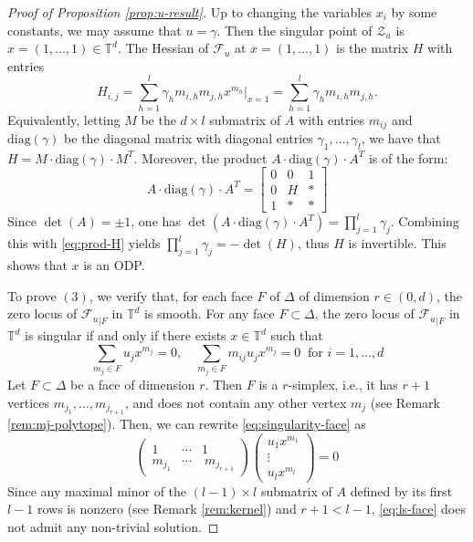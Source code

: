 \documentclass[11pt, reqno]{amsart}
\theoremstyle{plain}
\theoremstyle{definition}
\newcommand{\TT}{\mathbb{T}}
\begin{document}
\begin{proof}[Proof of Proposition \ref{prop:u-result}]
Up to changing the variables $x_i$ by some constants, we may assume that $u=\gamma$. Then the singular point of $\mathcal{Z}_u$ is $x=(1, \dots, 1) \in \TT^d$. The Hessian of $\mathcal{F}_u$ at $x=(1, \dots, 1)$ is the matrix $H$ with entries 
\begin{equation}\label{eq:hessian}
H_{i,j}= \sum_{h=1}^l \gamma_h m_{i,h} m_{j,h}  x^{m_h}\bigg|_{x=1} = \sum_{h=1}^l \gamma_h m_{i,h} m_{j,h}.
\end{equation}
Equivalently, letting $M$ be the $d \times l$ submatrix of ${A}$ with entries $m_{ij}$ and $\mathrm{diag}(\gamma)$  be the diagonal matrix with diagonal entries $\gamma_1, \dots, \gamma_l$, we have that $H=M \cdot \mathrm{diag}(\gamma) \cdot M^T$.
Moreover, 
the product ${A} \cdot \mathrm{diag}(\gamma)  \cdot {A}^T$ is of the form: 
\begin{equation}
\label{eq:prod-H}
{A} \cdot \mathrm{diag}(\gamma)  \cdot {A}^T =\begin{bmatrix}
0 & 0 & 1 \\
0 & H & * \\
1 & * & *
\end{bmatrix} 
\end{equation}
Since $\det({A})=\pm 1$, one has $\det({A} \cdot \mathrm{diag}(\gamma)  \cdot {A}^T)=\prod_{j=1}^l \gamma_j$. Combining this with \eqref{eq:prod-H} yields  $\prod_{j=1}^l \gamma_j=-\det(H)$,  thus $H$ is invertible. This shows that $x$ is an ODP.

To prove $(3)$, we verify that, for each face $F$ of $\Delta$ of dimension $r \in (0,d)$, the zero locus of ${\mathcal{F}_u}_{|F}$ in $\TT^d$ is smooth. 
For any face $F\subset \Delta$, the zero locus of ${\mathcal{F}_u}_{|F}$ in $\TT^d$ is singular if and only if there exists $x \in \TT^d$ such that 
\begin{equation}
\label{eq:singularity-face}
   \sum_{m_j \in F } u_j x^{m_{j}}=0, \quad  
    \sum_{m_j \in F }   m_{ij} u_j x^{m_j}=0  \ \text{ for } i=1,\dots,d
\end{equation}
Let $F\subset \Delta$ be a face of dimension $r$. Then $F$ is a $r$-simplex, i.e., it has $r+1$ vertices $m_{j_1}, \dots, m_{j_{r+1}}$, and does not contain any other vertex $m_j$ (see Remark \ref{rem:mj-polytope}). 
Then, we can rewrite  
\eqref{eq:singularity-face} as 
\begin{equation}
\label{eq:ls-face}
\begin{pmatrix}
1 & \cdots  & 1\\
m_{j_1} & \cdots & \ m_{j_{r+1}}
\end{pmatrix}\begin{pmatrix}
u_1 x^{m_1}\\
\vdots\\
u_l x^{m_l}
\end{pmatrix} = 0
\end{equation}
Since any maximal minor of the $(l-1)\times l$ submatrix of ${A}$ defined by its first $l-1$ rows is nonzero (see Remark \ref{rem:kernel}) and $r+1<l-1$,  \eqref{eq:ls-face} does not admit any non-trivial solution.  


\end{proof}
\end{document}
